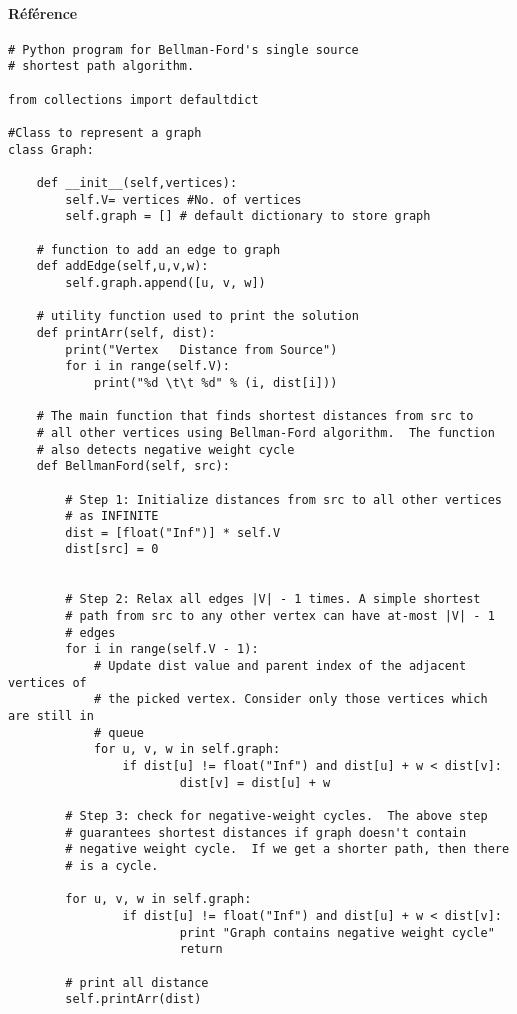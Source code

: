 \paragraph{Référence} \cite{Algorithm4}
\begin{lstlisting}
# Python program for Bellman-Ford's single source 
# shortest path algorithm.
 
from collections import defaultdict
 
#Class to represent a graph
class Graph:
 
    def __init__(self,vertices):
        self.V= vertices #No. of vertices
        self.graph = [] # default dictionary to store graph
  
    # function to add an edge to graph
    def addEdge(self,u,v,w):
        self.graph.append([u, v, w])
         
    # utility function used to print the solution
    def printArr(self, dist):
        print("Vertex   Distance from Source")
        for i in range(self.V):
            print("%d \t\t %d" % (i, dist[i]))
     
    # The main function that finds shortest distances from src to
    # all other vertices using Bellman-Ford algorithm.  The function
    # also detects negative weight cycle
    def BellmanFord(self, src):
 
        # Step 1: Initialize distances from src to all other vertices
        # as INFINITE
        dist = [float("Inf")] * self.V
        dist[src] = 0
 
 
        # Step 2: Relax all edges |V| - 1 times. A simple shortest 
        # path from src to any other vertex can have at-most |V| - 1 
        # edges
        for i in range(self.V - 1):
            # Update dist value and parent index of the adjacent vertices of
            # the picked vertex. Consider only those vertices which are still in
            # queue
            for u, v, w in self.graph:
                if dist[u] != float("Inf") and dist[u] + w < dist[v]:
                        dist[v] = dist[u] + w
 
        # Step 3: check for negative-weight cycles.  The above step 
        # guarantees shortest distances if graph doesn't contain 
        # negative weight cycle.  If we get a shorter path, then there
        # is a cycle.
 
        for u, v, w in self.graph:
                if dist[u] != float("Inf") and dist[u] + w < dist[v]:
                        print "Graph contains negative weight cycle"
                        return
                         
        # print all distance
        self.printArr(dist)
\end{lstlisting}

